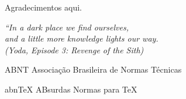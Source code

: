 \documentclass[
	12pt,				%
	openright,			%
	twoside,			%
	a4paper,			%
	hyphens,			%
	english,			%
	brazil				%
]{abntex2}
\begin{document}
	
	
	\frenchspacing 
	
	
	\imprimircapa
	
	\imprimirfolhaderosto*
	
	
	

	
	\begin{agradecimentos}
		Agradecimentos aqui.	
	\end{agradecimentos}
	
	\begin{epigrafe}
		\vspace*{\fill}
		\begin{flushright}
			\textit{``In a dark place we find ourselves,\\
				and a little more knowledge	lights our way.\\
				(Yoda, Episode 3: Revenge of the Sith)}
		\end{flushright}
	\end{epigrafe}
	
	
	
	\listoffigures*
	\cleardoublepage
	
	\listoftables*
	\cleardoublepage
	
	\begin{siglas}
		\item[ABNT] Associação Brasileira de Normas Técnicas
		\item[abnTeX] ABsurdas Normas para TeX
	\end{siglas}
	
\end{document}
